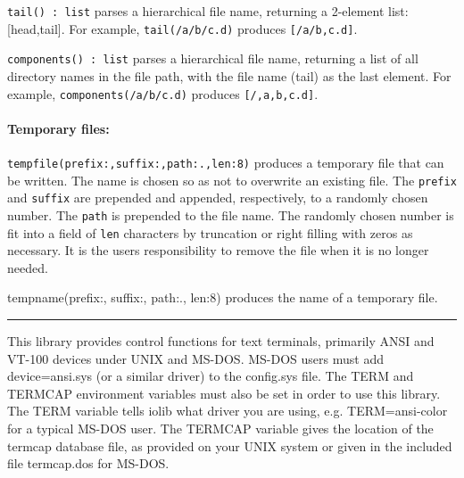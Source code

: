 \texttt{tail() : list} parses a hierarchical file name, returning a
2-element list: [head,tail]. For example,
\texttt{tail({\textquotedbl}/a/b/c.d{\textquotedbl})} produces
\texttt{[{\textquotedbl}/a/b{\textquotedbl},{\textquotedbl}c.d{\textquotedbl}]}.

\texttt{components() : list} parses a hierarchical file name, returning
a list of all directory names in the file path, with the file name
(tail) as the last element. For example,
\texttt{components({\textquotedbl}/a/b/c.d{\textquotedbl})} produces
\texttt{[{\textquotedbl}/{\textquotedbl},{\textquotedbl}a{\textquotedbl},{\textquotedbl}b{\textquotedbl},{\textquotedbl}c.d{\textquotedbl}]}.

\paragraph{Temporary files:}
\texttt{tempfile(prefix:{\textquotedbl}{\textquotedbl},suffix:{\textquotedbl}{\textquotedbl},path:{\textquotedbl}.{\textquotedbl},len:8)}
produces a temporary file that can be written. The name is chosen so as
not to overwrite an existing file. The \texttt{prefix} and
\texttt{suffix} are prepended and appended, respectively, to a randomly
chosen number. The \texttt{path} is prepended to the file name. The
randomly chosen number is fit into a field of \texttt{len} characters
by truncation or right filling with zeros as necessary. It is the
user{\textquotesingle}s responsibility to remove the file when it is no
longer needed.

\textsf{tempname(prefix:{\textquotedbl}{\textquotedbl},
suffix:{\textquotedbl}{\textquotedbl},
path:{\textquotedbl}.{\textquotedbl}, len:8)} produces the name of a
temporary file.

\vspace{0.25cm}\hrule{}

This library provides control functions for text terminals, primarily
ANSI and VT-100 devices under UNIX and MS-DOS. MS-DOS users must add
{\textquotedbl}device=ansi.sys{\textquotedbl} (or a similar driver) to
the config.sys file. The TERM and TERMCAP environment variables must also be set in order to use
this library. The TERM variable tells iolib what driver you are using,
e.g. TERM=ansi-color for a typical MS-DOS user. The TERMCAP variable
gives the location of the termcap database file, as provided on your
UNIX system or given in the included file termcap.dos for MS-DOS.

